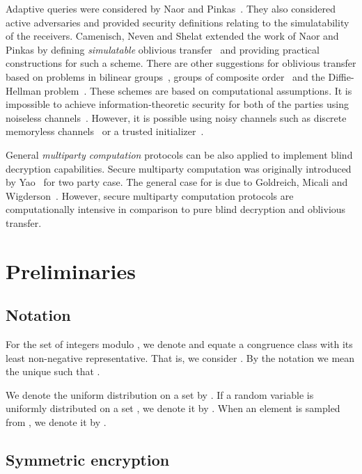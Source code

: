 \documentclass[10pt,journal]{IEEEtran}
\begin{document}
Adaptive queries were considered by Naor and Pinkas~\cite{Naor_1999_2}. They also considered active adversaries
and provided security definitions relating to the simulatability of the receivers.
Camenisch, Neven and Shelat extended the work of Naor and Pinkas by defining \emph{simulatable} oblivious transfer~\cite{Camenisch_2007}
and providing practical constructions for such a scheme.
There are other suggestions for oblivious transfer based on problems in bilinear groups~\cite{Green_2008},
groups of composite order~\cite{Jarecki_2009} and the Diffie-Hellman problem~\cite{Kurosawa_2009,Kurosawa_2010,Green_2011_2,Kurosawa_2011,Zhang_2013,Guleria_2015}.
These schemes
are based on computational assumptions.
It is impossible to achieve information-theoretic
security for both of the parties using noiseless channels~\cite{Damgard_1999}. However, it
is possible using noisy channels such as discrete memoryless channels~\cite{Crepeau_2005}
or a trusted initializer~\cite{Rivest_1999}.

General \emph{multiparty computation} protocols can be also applied to implement blind decryption capabilities.
Secure multiparty computation was originally introduced by Yao~\cite{Yao_1982_2} for two party case.
The general case for  is due to Goldreich, Micali and Wigderson~\cite{Goldreich_1987}.
However, secure multiparty computation protocols are computationally intensive in comparison
to pure blind decryption and oblivious transfer.

\section{Preliminaries}
\label{sec:Preliminaries}

\subsection{Notation}

For the set of integers modulo ,
we denote  and equate a congruence class
with its least non-negative representative. That is,
we consider . By the notation  we mean
the unique  such that .

We denote the uniform distribution on a set  by . If a random variable
 is uniformly distributed on a set , we denote it by .
When an element  is sampled from , we denote it by .

\subsection{Symmetric encryption}
\end{document}
